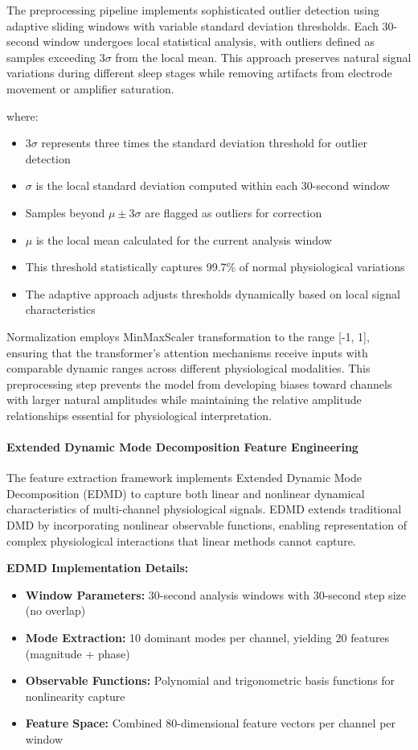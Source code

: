 \documentclass[a4paper,12pt,twoside]{article}
\begin{document}
The preprocessing pipeline implements sophisticated outlier detection using adaptive sliding windows with variable standard deviation thresholds. Each 30-second window undergoes local statistical analysis, with outliers defined as samples exceeding $3\sigma$ from the local mean. This approach preserves natural signal variations during different sleep stages while removing artifacts from electrode movement or amplifier saturation.

where:
\begin{itemize}
    \item $3\sigma$ represents three times the standard deviation threshold for outlier detection
    \item $\sigma$ is the local standard deviation computed within each 30-second window
    \item Samples beyond $\mu \pm 3\sigma$ are flagged as outliers for correction
    \item $\mu$ is the local mean calculated for the current analysis window
    \item This threshold statistically captures 99.7\% of normal physiological variations
    \item The adaptive approach adjusts thresholds dynamically based on local signal characteristics
\end{itemize}

Normalization employs MinMaxScaler transformation to the range [-1, 1], ensuring that the transformer's attention mechanisms receive inputs with comparable dynamic ranges across different physiological modalities. This preprocessing step prevents the model from developing biases toward channels with larger natural amplitudes while maintaining the relative amplitude relationships essential for physiological interpretation.

\paragraph{Extended Dynamic Mode Decomposition Feature Engineering}

The feature extraction framework implements Extended Dynamic Mode Decomposition (EDMD) to capture both linear and nonlinear dynamical characteristics of multi-channel physiological signals. EDMD extends traditional DMD by incorporating nonlinear observable functions, enabling representation of complex physiological interactions that linear methods cannot capture.

\textbf{EDMD Implementation Details:}
\begin{itemize}
    \item \textbf{Window Parameters:} 30-second analysis windows with 30-second step size (no overlap)
    \item \textbf{Mode Extraction:} 10 dominant modes per channel, yielding 20 features (magnitude + phase)
    \item \textbf{Observable Functions:} Polynomial and trigonometric basis functions for nonlinearity capture
    \item \textbf{Feature Space:} Combined 80-dimensional feature vectors per channel per window
\end{itemize}
\end{document}
